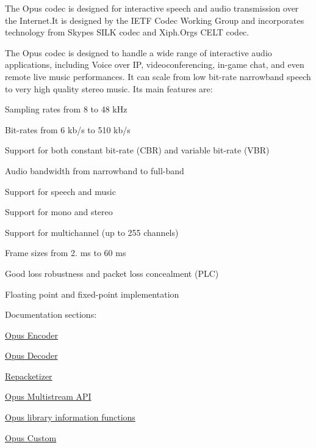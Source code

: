 The Opus codec is designed for interactive speech and audio transmission over the Internet.\+It is designed by the I\+E\+TF Codec Working Group and incorporates technology from Skype\textquotesingle{}s S\+I\+LK codec and Xiph.\+Org\textquotesingle{}s C\+E\+LT codec.

The Opus codec is designed to handle a wide range of interactive audio applications, including Voice over IP, videoconferencing, in-\/game chat, and even remote live music performances. It can scale from low bit-\/rate narrowband speech to very high quality stereo music. Its main features are\+:

\begin{DoxyItemize}
\item Sampling rates from 8 to 48 k\+Hz \item Bit-\/rates from 6 kb/s to 510 kb/s \item Support for both constant bit-\/rate (C\+BR) and variable bit-\/rate (V\+BR) \item Audio bandwidth from narrowband to full-\/band \item Support for speech and music \item Support for mono and stereo \item Support for multichannel (up to 255 channels) \item Frame sizes from 2. ms to 60 ms \item Good loss robustness and packet loss concealment (P\+LC) \item Floating point and fixed-\/point implementation\end{DoxyItemize}
Documentation sections\+: \begin{DoxyItemize}
\item \hyperlink{group__opus__encoder}{Opus Encoder} \item \hyperlink{group__opus__decoder}{Opus Decoder} \item \hyperlink{group__opus__repacketizer}{Repacketizer} \item \hyperlink{group__opus__multistream}{Opus Multistream A\+PI} \item \hyperlink{group__opus__libinfo}{Opus library information functions} \item \hyperlink{group__opus__custom}{Opus Custom} \end{DoxyItemize}
